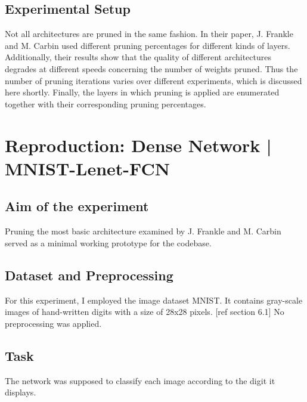 \subsection*{Experimental Setup}
Not all architectures are pruned in the same fashion. In their paper, J. Frankle and M. Carbin used different pruning percentages for different kinds of layers.\cite{LTH} Additionally, their results show that the quality of different architectures degrades at different speeds concerning the number of weights pruned. Thus the number of pruning iterations varies over different experiments, which is discussed here shortly.
Finally, the layers in which pruning is applied are enumerated together with their corresponding pruning percentages.


\section{Reproduction: Dense Network | MNIST-Lenet-FCN}
\subsection*{Aim of the experiment}
Pruning the most basic architecture examined by J. Frankle and M. Carbin served as a minimal working prototype for the codebase.
\subsection*{Dataset and Preprocessing}
For this experiment, I employed the image dataset MNIST. It contains gray-scale images of hand-written digits with a size of 28x28 pixels. [ref section 6.1]
No preprocessing was applied.
\subsection*{Task}
The network was supposed to classify each image according to the digit it displays.
